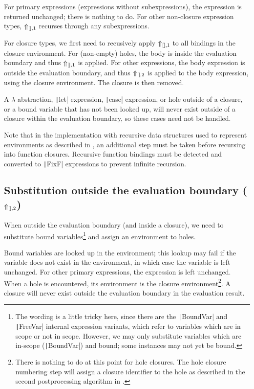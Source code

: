 For primary expressions (expressions without subexpressions), the expression is returned unchanged; there is nothing to do. For other non-closure expression types, $\Uparrow_{[],1}$ recurses through any subexpressions.

For closure types, we first need to recusively apply $\Uparrow_{[],1}$ to all bindings in the closure environment. For (non-empty) holes, the body is inside the evaluation boundary and thus $\Uparrow_{[],1}$ is applied. For other expressions, the body expression is outside the evaluation boundary, and thus $\Uparrow_{[],2}$ is applied to the body expression, using the closure environment. The closure is then removed.

A $\lambda$ abstraction, \texttt|let| expression, \texttt|case| expression, or hole outside of a closure, or a bound variable that has not been looked up, will never exist outside of a closure within the evaluation boundary, so these cases need not be handled.

Note that in the implementation with recursive data structures used to represent environments as described in , an additional step must be taken before recursing into function closures. Recursive function bindings must be detected and converted to \texttt|FixF| expressions to prevent infinite recursion.


\subsection{Substitution outside the evaluation boundary ($\Uparrow_{[],2}$)}
\label{sec:postprocessing-subst-outside}

When outside the evaluation boundary (and inside a closure), we need to substitute bound variables\footnote{The wording is a little tricky here, since there are the \texttt|BoundVar| and \texttt|FreeVar| internal expression variants, which refer to variables which are in scope or not in scope. However, we may only substitute variables which are in-scope (\texttt|BoundVar|) and bound; some instances may not yet be bound.} and assign an environment to holes.

Bound variables are looked up in the environment; this lookup may fail if the variable does not exist in the environment, in which case the variable is left unchanged. For other primary expressions, the expression is left unchanged. When a hole is encountered, its environment is the closure environment\footnote{There is nothing to do at this point for hole closures. The hole closure numbering step will assign a closure identifier to the hole as described in the second postprocessing algorithm in .}. A closure will never exist outside the evaluation boundary in the evaluation result.

